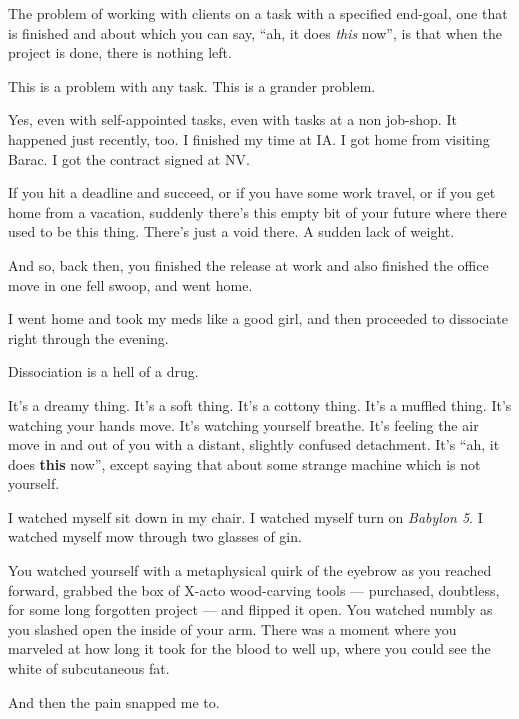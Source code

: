 \noindent The problem of working with clients on a task with a specified end-goal, one that is finished and about which you can say, ``ah, it does \emph{this} now'', is that when the project is done, there is nothing left.

\begin{ally}
This is a problem with any task. This is a grander problem.
\end{ally}
Yes, even with self-appointed tasks, even with tasks at a non job-shop. It happened just recently, too. I finished my time at IA. I got home from visiting Barac. I got the contract signed at NV.

If you hit a deadline and succeed, or if you have some work travel, or if you get home from a vacation, suddenly there's this empty bit of your future where there used to be this thing. There's just a void there. A sudden lack of weight.

\begin{ally}
And so, back then, you finished the release at work and also finished the office move in one fell swoop, and went home.
\end{ally}
I went home and took my meds like a good girl, and then proceeded to dissociate right through the evening.

Dissociation is a hell of a drug.

\begin{ally}
It's a dreamy thing. It's a soft thing. It's a cottony thing. It's a muffled thing. It's watching your hands move. It's watching yourself breathe. It's feeling the air move in and out of you with a distant, slightly confused detachment. It's ``ah, it does \textbf{this} now'', except saying that about some strange machine which is not yourself.
\end{ally}
I watched myself sit down in my chair. I watched myself turn on \emph{Babylon 5}. I watched myself mow through two glasses of gin.

\begin{ally}
You watched yourself with a metaphysical quirk of the eyebrow as you reached forward, grabbed the box of X-acto wood-carving tools --- purchased, doubtless, for some long forgotten project --- and flipped it open. You watched numbly as you slashed open the inside of your arm. There was a moment where you marveled at how long it took for the blood to well up, where you could see the white of subcutaneous fat.
\end{ally}
And then the pain snapped me to.
\newpage


